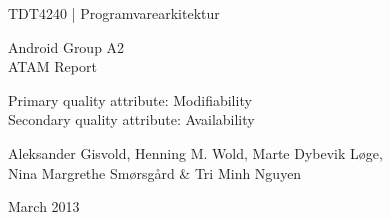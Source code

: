 \begin{titlepage}
\begin{center}
\vspace*{1in}
{\LARGE TDT4240 | Programvarearkitektur}
\par
\vspace{1in}
{\LARGE Android Group A2\\ATAM Report}
\par
\vspace{1in}
{\LARGE Primary quality attribute: Modifiability\\Secondary quality attribute:
Availability}
\par
\vfill
\par
\vspace{0.5in}
Aleksander Gisvold, Henning M. Wold, Marte Dybevik Løge,\\
Nina Margrethe Smørsgård \& Tri Minh Nguyen
\par
March 2013
\end{center}
\end{titlepage}
